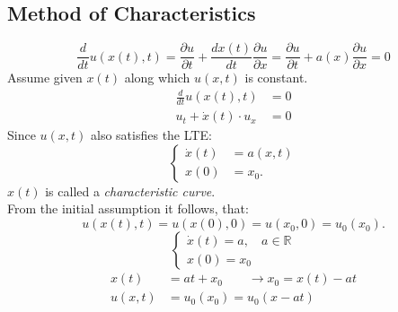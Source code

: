 \subsection{Method of Characteristics}
    \vspace{-1em}
    $$
        \frac{d}{dt}u(x(t),t) = \frac{\partial u}{\partial t} + \frac{d x(t)}{dt}\frac{\partial u}{\partial x} = \frac{\partial u}{\partial t} + a(x) \frac{\partial u}{\partial x} = 0
    $$
    Assume given $x(t)$ along which $u(x,t)$ is constant.
    \begin{align*}
        \frac{d}{dt} u(x(t),t) &= 0\\
        u_t + \dot{x}(t) \cdot u_x &= 0
    \end{align*}
    Since $u(x,t)$ also satisfies the LTE:
    $$
        \begin{cases}
            \dot{x}(t) &= a(x,t)\\
            x(0) &= x_0.
        \end{cases}
    $$
    $x(t)$ is called a \textit{characteristic curve}.\\
    From the initial assumption it follows, that:
    $$
        u(x(t),t) = u(x(0),0) = u(x_0,0) = u_0(x_0).
    $$
        \vspace{0.5em}
        $$
            \begin{cases}
                \dot{x}(t) = a, & a \in \mathbb{R}\\
                x(0) = x_0
            \end{cases}
        $$
        \begin{align*}
            x(t) &= at + x_0 \qquad \rightarrow x_0 = x(t) - at\\[0.5em]
            u(x,t) &= u_0(x_0) = u_0(x - at)
        \end{align*}